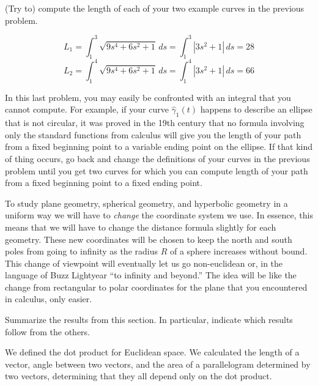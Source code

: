 \documentclass[newpage,hints,handout,nooutcomes,noauthor,12pt]{ximera}
\begin{document}
\begin{problem}
(Try to) compute the length of each of your two example curves in the previous
problem.

\begin{freeResponse}
\[
L_{1}= \int_{1}^{3}  \sqrt{9s^4 + 6s^2 +1} \,ds = \int_{1}^{3} |3s^2 +1| \, ds = 28
\]
\[
L_{2}= \int_{1}^{4}  \sqrt{9s^4 + 6s^2 +1} \,ds = \int_{1}^{4} |3s^2 +1| \, ds = 66
\]
\end{freeResponse}

\end{problem}

\begin{remark}
  In this last problem, you may easily be confronted with an integral that you
  cannot compute. For example, if your curve $\hat{\gamma}_{1}(t)$ happens to
  describe an ellipse that is not circular, it was proved in the 19th century
  that no formula involving only the standard functions from calculus will give
  you the length of your path from a fixed beginning point to a variable ending
  point on the ellipse. If that kind of thing occurs, go back and change the
  definitions of your curves in the previous problem until you get two
  curves for which you can compute length of your path from a fixed
  beginning point to a fixed ending point. %
\end{remark}





To study plane geometry, spherical geometry, and hyperbolic geometry in a
uniform way we will have to \textit{change} the coordinate system we use. In
essence, this means that we will have to change the distance formula slightly
for each geometry. These new coordinates will be chosen to keep the north and
south poles from going to infinity as the radius $R$ of a sphere increases
without bound. This change of viewpoint will eventually let us go non-euclidean
or, in the language of Buzz Lightyear ``to infinity and beyond.'' The idea will
be like the change from rectangular to polar coordinates for the plane that you
encountered in calculus, only easier.


\begin{problem}
Summarize the results from this section. In particular, indicate which
results follow from the others.
\begin{freeResponse}
We defined the dot product for Euclidean space. We calculated the length of a vector, angle between two vectors, and the area of a parallelogram determined by two vectors, determining that they all depend only on the dot product. 
\end{freeResponse}
\end{problem}
\end{document}
